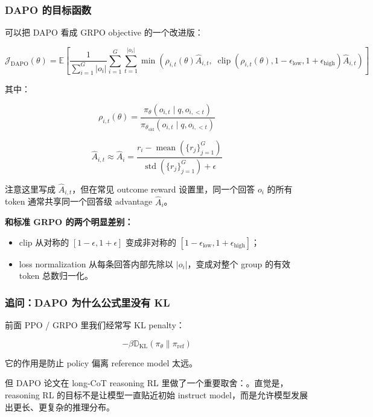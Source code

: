 \subsubsection{DAPO 的目标函数}

可以把 DAPO 看成 GRPO objective 的一个改进版：

\[
\mathcal{J}_\text{DAPO}(\theta)
=
\mathbb{E}
\left[
\frac{1}{
\sum_{i=1}^{G}|o_i|
}
\sum_{i=1}^{G}
\sum_{t=1}^{|o_i|}
\min
\left(
\rho_{i,t}(\theta)\hat{A}_{i,t},\;
\operatorname{clip}
\left(
\rho_{i,t}(\theta),
1-\epsilon_\text{low},
1+\epsilon_\text{high}
\right)
\hat{A}_{i,t}
\right)
\right]
\]

其中：

\[
\rho_{i,t}(\theta)
=
\frac{
\pi_\theta(o_{i,t}\mid q,o_{i,<t})
}{
\pi_{\theta_\text{old}}(o_{i,t}\mid q,o_{i,<t})
}
\]

\[
\hat{A}_{i,t}
\approx
\hat{A}_i
=
\frac{
r_i-\operatorname{mean}(\{r_j\}_{j=1}^{G})
}{
\operatorname{std}(\{r_j\}_{j=1}^{G})+\epsilon
}
\]

注意这里写成 $\hat{A}_{i,t}$，但在常见 outcome reward 设置里，同一个回答 $o_i$ 的所有 token 通常共享同一个回答级 advantage $\hat{A}_i$。

\begin{warnbox}
\textbf{和标准 GRPO 的两个明显差别：}
\begin{itemize}[leftmargin=1.5em]
  \item clip 从对称的 $[1-\epsilon,1+\epsilon]$ 变成非对称的 $[1-\epsilon_\text{low},1+\epsilon_\text{high}]$；
  \item loss normalization 从每条回答内部先除以 $|o_i|$，变成对整个 group 的有效 token 总数归一化。
\end{itemize}
\end{warnbox}

\subsubsection{追问：DAPO 为什么公式里没有 KL}

前面 PPO / GRPO 里我们经常写 KL penalty：

\[
-
\beta
\mathbb{D}_\text{KL}
(\pi_\theta \| \pi_\text{ref})
\]

它的作用是防止 policy 偏离 reference model 太远。

但 DAPO 论文在 long-CoT reasoning RL 里做了一个重要取舍：。直觉是，reasoning RL 的目标不是让模型一直贴近初始 instruct model，而是允许模型发展出更长、更复杂的推理分布。

